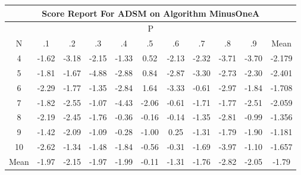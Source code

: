 \documentclass[11pt,a4paper]{report}
\begin{document}
\begin{longtable}{ | c || c | c | c | c | c | c | c | c | c || c |}
\hline
\multicolumn{11}{|c|}{ Score Report For ADSM on Algorithm MinusOneA} \\
\hline
\multicolumn{11}{|c|}{ P } \\
\hline
N & .1 & .2 & .3 & .4 & .5 & .6 & .7 & .8 & .9 & Mean\\
 \hline
 \hline
 \endhead
  4 &  \cellcolor[HTML]{FFD7D7} -1.62 &  \cellcolor[HTML]{FFAFAF} -3.18 &  \cellcolor[HTML]{FFC7C7} -2.15 &  \cellcolor[HTML]{FFDFDF} -1.33 &  \cellcolor[HTML]{EFEFFF} 0.52 &  \cellcolor[HTML]{FFC7C7} -2.13 &  \cellcolor[HTML]{FFC7C7} -2.32 &  \cellcolor[HTML]{FF9F9F} -3.71 &  \cellcolor[HTML]{FF9F9F} -3.70 & -2.179 \\
  5 &  \cellcolor[HTML]{FFCFCF} -1.81 &  \cellcolor[HTML]{FFD7D7} -1.67 &  \cellcolor[HTML]{FF8787} -4.88 &  \cellcolor[HTML]{FFB7B7} -2.88 &  \cellcolor[HTML]{E7E7FF} 0.84 &  \cellcolor[HTML]{FFB7B7} -2.87 &  \cellcolor[HTML]{FFAFAF} -3.30 &  \cellcolor[HTML]{FFB7B7} -2.73 &  \cellcolor[HTML]{FFC7C7} -2.30 & -2.401 \\
  6 &  \cellcolor[HTML]{FFC7C7} -2.29 &  \cellcolor[HTML]{FFCFCF} -1.77 &  \cellcolor[HTML]{FFDFDF} -1.35 &  \cellcolor[HTML]{FFB7B7} -2.84 &  \cellcolor[HTML]{D7D7FF} 1.64 &  \cellcolor[HTML]{FFAFAF} -3.33 &  \cellcolor[HTML]{FFEFEF} -0.61 &  \cellcolor[HTML]{FFB7B7} -2.97 &  \cellcolor[HTML]{FFCFCF} -1.84 & -1.708 \\
  7 &  \cellcolor[HTML]{FFCFCF} -1.82 &  \cellcolor[HTML]{FFBFBF} -2.55 &  \cellcolor[HTML]{FFE7E7} -1.07 &  \cellcolor[HTML]{FF8F8F} -4.43 &  \cellcolor[HTML]{FFC7C7} -2.06 &  \cellcolor[HTML]{FFEFEF} -0.61 &  \cellcolor[HTML]{FFD7D7} -1.71 &  \cellcolor[HTML]{FFCFCF} -1.77 &  \cellcolor[HTML]{FFBFBF} -2.51 & -2.059 \\
  8 &  \cellcolor[HTML]{FFC7C7} -2.19 &  \cellcolor[HTML]{FFBFBF} -2.45 &  \cellcolor[HTML]{FFCFCF} -1.76 &  \cellcolor[HTML]{FFF7F7} -0.36 &  \cellcolor[HTML]{FFFFFF} -0.16 &  \cellcolor[HTML]{FFFFFF} -0.14 &  \cellcolor[HTML]{FFDFDF} -1.35 &  \cellcolor[HTML]{FFB7B7} -2.81 &  \cellcolor[HTML]{FFE7E7} -0.99 & -1.356 \\
  9 &  \cellcolor[HTML]{FFDFDF} -1.42 &  \cellcolor[HTML]{FFC7C7} -2.09 &  \cellcolor[HTML]{FFE7E7} -1.09 &  \cellcolor[HTML]{FFF7F7} -0.28 &  \cellcolor[HTML]{FFE7E7} -1.00 &  \cellcolor[HTML]{F7F7FF} 0.25 &  \cellcolor[HTML]{FFDFDF} -1.31 &  \cellcolor[HTML]{FFCFCF} -1.79 &  \cellcolor[HTML]{FFCFCF} -1.90 & -1.181 \\
  10 &  \cellcolor[HTML]{FFBFBF} -2.62 &  \cellcolor[HTML]{FFDFDF} -1.34 &  \cellcolor[HTML]{FFD7D7} -1.48 &  \cellcolor[HTML]{FFCFCF} -1.84 &  \cellcolor[HTML]{FFEFEF} -0.56 &  \cellcolor[HTML]{FFF7F7} -0.31 &  \cellcolor[HTML]{FFD7D7} -1.69 &  \cellcolor[HTML]{FF9797} -3.97 &  \cellcolor[HTML]{FFE7E7} -1.10 & -1.657 \\
 \hline
 \hline
Mean &  \cellcolor[HTML]{FFCFCF} -1.97 &  \cellcolor[HTML]{FFC7C7} -2.15 &  \cellcolor[HTML]{FFCFCF} -1.97 &  \cellcolor[HTML]{FFCFCF} -1.99 &  \cellcolor[HTML]{FFFFFF} -0.11 &  \cellcolor[HTML]{FFDFDF} -1.31 &  \cellcolor[HTML]{FFCFCF} -1.76 &  \cellcolor[HTML]{FFB7B7} -2.82 &  \cellcolor[HTML]{FFCFCF} -2.05 &  \cellcolor[HTML]{FFCFCF} -1.79
\end{longtable}
\end{document}
